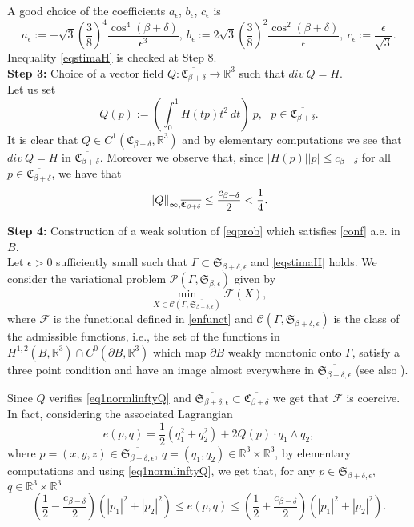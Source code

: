 \documentclass[a4paper,reqno,10pt,oneside]{amsart}
\numberwithin{equation}{section}
\begin{document}
A good choice of the coefficients $a_{\epsilon}$, $b_{\epsilon}$, $c_{\epsilon}$ is
$$ a_{\epsilon}:=- \sqrt{3} \left(\frac{3}{8}\right)^4 \frac{ \cos^4(\beta+\delta)}{\epsilon^3}, \ b_{\epsilon}:=2\sqrt{3} \left(\frac{3}{8}\right)^2  \frac{ \cos^2(\beta+\delta)}{\epsilon}, \ c_{\epsilon}:= \frac{\epsilon}{\sqrt{3}}.  $$
Inequality \eqref{eqstimaH} is checked at Step 8.\\

\noindent\textbf{Step 3:} Choice of a vector field $Q: \overline{{\mathfrak{C}_{\beta+\delta}}} \to {\mathbb R}^3$ such that $div\ Q=H$.\\
Let us set $$Q(p):= \left(\int_{0}^1 H(tp)t^2 \ dt\right) \ p,\ \ \ p \in \overline{{\mathfrak{C}_{\beta+\delta}}}.$$
It is clear that $Q \in C^{1}(\overline{{\mathfrak{C}_{\beta+\delta}}},{\mathbb R}^3)$ and by elementary computations we see that $ div \ Q =  H$ in $\overline{{\mathfrak{C}_{\beta+\delta}}}$. 
Moreover we observe that, since $|H(p)| |p| \leq c_{\beta-\delta}$ for all $p \in \overline{{\mathfrak{C}_{\beta+\delta}}}$, we have that
\begin{equation}\label{eq1normlinftyQ}
\|Q\|_{\infty,  \overline{{\mathfrak{C}_{\beta+\delta}}}} \leq  \frac{ c_{\beta-\delta}}{2} < \frac{1}{4}.\\ 
\end{equation}

\noindent\textbf{Step 4:} Construction of a weak solution of \eqref{eqprob} which satisfies \eqref{conf} a.e. in $B$.\\
Let ${\epsilon}>0$ sufficiently small such that $\Gamma \subset {\mathfrak{S}_{\beta + \delta,\epsilon}}$ and \eqref{eqstimaH} holds. We consider the variational problem $\mathcal{P}(\Gamma,\overline{\mathfrak{S}_{\beta,\epsilon}})$ given by $$\min_{X \in \mathcal{C}(\Gamma,\overline{\mathfrak{S}_{\beta + \delta,\epsilon}})} \mathcal{F}(X),$$
where $ \mathcal{F}$ is the functional defined in \eqref{enfunct} and $\mathcal{C}(\Gamma,\overline{\mathfrak{S}_{\beta+\delta,\epsilon}})$ is the class of the admissible functions, i.e., the set of the functions in $H^{1,2}(B,{\mathbb R}^3)\cap C^0(\partial B, {\mathbb R}^3)$ which map $\partial B$ weakly monotonic onto $\Gamma$, satisfy a three point condition and have an image almost everywhere in $\overline{\mathfrak{S}_{\beta+\delta,\epsilon}}$ (see also \cite{MinSurf}).

Since $Q$ verifies \eqref{eq1normlinftyQ} and $ \overline{\mathfrak{S}_{\beta+\delta, {\epsilon}}} \subset \overline{\mathfrak{C}_{\beta+\delta}}$ we get that $\mathcal{F}$ is coercive. In fact, considering the associated Lagrangian $$e(p,q)=\frac{1}{2}(q_1^2+q_2^2) +2Q(p) \cdot q_1\wedge q_2,$$
where $p=(x,y,z) \in \overline{\mathfrak{S}_{\beta+\delta, {\epsilon}}}$, $q=(q_1, q_2) \in {\mathbb R}^3\times{\mathbb R}^3$, by elementary computations and using \eqref{eq1normlinftyQ}, we get that, for any $p \in\overline{\mathfrak{S}_{\beta + \delta,\epsilon}}$, $q \in  {\mathbb R}^3\times{\mathbb R}^3$
$$\left(\frac{1}{2} - \frac{c_{\beta - \delta}}{2}\right) (|p_1|^2+|p_2|^2) \leq e(p,q) \leq \left(\frac{1}{2} + \frac{c_{\beta-\delta}}{2}\right)  (|p_1|^2+|p_2|^2).$$
 
\end{document}
